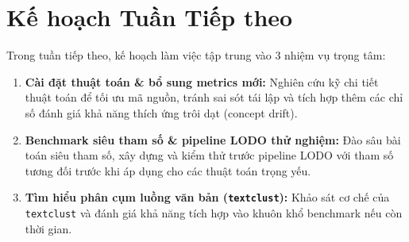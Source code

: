 \section{Kế hoạch Tuần Tiếp theo}
\label{sec:next_week}

Trong tuần tiếp theo, kế hoạch làm việc tập trung vào 3 nhiệm vụ trọng tâm:

\begin{enumerate}[label=\textbf{N\arabic*.},leftmargin=2.2em,itemsep=4pt]
  \item \textbf{Cài đặt thuật toán \& bổ sung metrics mới:} Nghiên cứu kỹ chi tiết thuật toán để tối ưu mã nguồn, tránh sai sót tái lập và tích hợp thêm các chỉ số đánh giá khả năng thích ứng trôi dạt (concept drift).
  \item \textbf{Benchmark siêu tham số \& pipeline LODO thử nghiệm:} Đào sâu bài toán siêu tham số, xây dựng và kiểm thử trước pipeline LODO với tham số tương đối trước khi áp dụng cho các thuật toán trọng yếu.
  \item \textbf{Tìm hiểu phân cụm luồng văn bản (\texttt{textclust}):} Khảo sát cơ chế của \texttt{textclust} và đánh giá khả năng tích hợp vào khuôn khổ benchmark nếu còn thời gian.
\end{enumerate}
